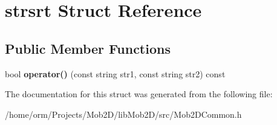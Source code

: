 \hypertarget{structstrsrt}{
\section{strsrt Struct Reference}
\label{structstrsrt}
}
\subsection*{Public Member Functions}
\begin{DoxyCompactItemize}
\item 
\hypertarget{structstrsrt_a59e7c453a4c1fbc3baf9fa1478b2cee8}{
bool {\bfseries operator()} (const string str1, const string str2) const }
\label{structstrsrt_a59e7c453a4c1fbc3baf9fa1478b2cee8}

\end{DoxyCompactItemize}


The documentation for this struct was generated from the following file:\begin{DoxyCompactItemize}
\item 
/home/orm/Projects/Mob2D/libMob2D/src/Mob2DCommon.h\end{DoxyCompactItemize}
